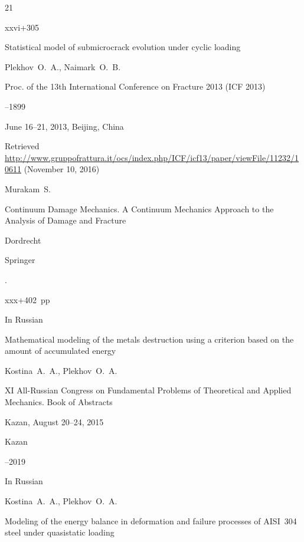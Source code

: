 \begin{thebibliography}{21}

\totalpages xxvi+305




\paper Statistical model of submicrocrack evolution under cyclic loading

\by Plekhov~O.~A., Naimark~O.~B.

\inbook Proc. of the 13th International Conference on Fracture 2013 \rm (ICF 2013)


--1899

\procinfo June 16–21, 2013, Beijing, China

\elink Retrieved  \url{http://www.gruppofrattura.it/ocs/index.php/ICF/icf13/paper/viewFile/11232/10611} {(November 10, 2016)}




\by Murakam~S.

\book  Continuum Damage Mechanics. A Continuum Mechanics Approach to the Analysis of Damage and Fracture

\publaddr Dordrecht

\publ Springer

.

\totalpages xxx+402~pp





\lang In Russian

\paper Mathematical modeling of the metals destruction   using a criterion based on the amount of accumulated energy

\by Kostina~A.~A., Plekhov~O.~A.

\inbook XI All-Russian Congress on Fundamental Problems of Theoretical and Applied Mechanics. Book of Abstracts

\procinfo Kazan, August 20--24, 2015

\publaddr Kazan


--2019




\lang In Russian

\by Kostina~A.~A., Plekhov~O.~A.

\paper Modeling of the energy balance in deformation and failure processes of AISI~304 steel under quasistatic loading


\end{thebibliography}
